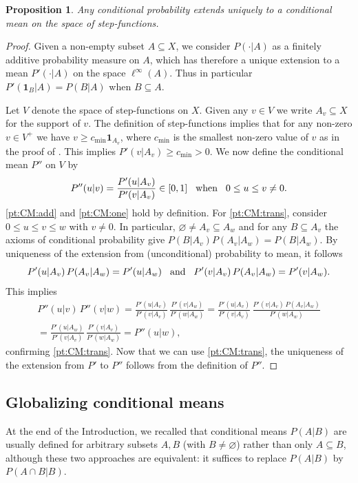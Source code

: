 \documentclass[11pt]{amsart}
\numberwithin{equation}{section}
\newtheorem{prop}[thm]{Proposition}
\theoremstyle{definition}
\theoremstyle{definition}
\newcommand*{\se}{\subseteq}
\newcommand*{\one}{\boldsymbol{1}}
\begin{document}
\begin{prop}\label{prop:CP-CM-step}
Any conditional probability extends uniquely to a conditional mean on the space of step-functions.
\end{prop}

\begin{proof}
Given a non-empty subset $A\se X$, we consider $P(\cdot|A)$ as a finitely additive probability measure on $A$, which has therefore a unique extension to a mean $P'(\cdot| A)$ on the space $\ell^\infty(A)$. Thus in particular $P'(\one_B|A) = P(B|A)$ when $B\se A$.

Let $V$ denote the space of step-functions on $X$. Given any $v\in V$ we write $A_v\se X$ for the support of $v$. The definition of step-functions implies that for any non-zero $v\in V^+$ we have $v\geq c_\mathrm{min} \one_{A_v}$, where $c_\mathrm{min}$ is the smallest non-zero value of $v$ as in the proof of . This implies $P'(v | A_v) \geq c_\mathrm{min} >0$. We now define the conditional mean $P''$ on $V$ by
\begin{equation*}
P''(u|v) = \frac{P'(u|A_v)}{P'(v|A_v)} \in[0, 1]\kern3mm \text{when}\kern3mm 0\leq u \leq v \neq 0.
\end{equation*}
\ref{pt:CM:add} and \ref{pt:CM:one} hold by definition. For \ref{pt:CM:trans}, consider $0\leq u \leq v \leq w$ with $v\neq 0$. In particular, $\varnothing\neq A_v \se A_w$ and for any $B\se A_v$ the axioms of conditional probability give $P(B|A_v) P(A_v|A_w) = P(B|A_w)$. By uniqueness of the extension from (unconditional) probability to mean, it follows
\begin{equation*}
P'(u|A_v) \, P(A_v|A_w) = P'(u|A_w)\kern3mm \text{and}\kern3mm P'(v|A_v) \, P(A_v|A_w) = P'(v|A_w).
\end{equation*}
This implies
\begin{multline*}
P''(u|v) \, P''(v|w) =\frac{P'(u|A_v)}{P'(v|A_v)} \, \frac{P'(v|A_w)}{P'(w|A_w)} =\frac{P'(u|A_v)}{P'(v|A_v)} \, \frac{ P'(v|A_v) \, P(A_v|A_w)} {P'(w|A_w)} \\
 = \frac{P'(u|A_w)}{P'(v|A_v)} \, \frac{ P'(v|A_v)} {P'(w|A_w)} = P''(u|w),
\end{multline*}
confirming \ref{pt:CM:trans}. Now that we can use \ref{pt:CM:trans}, the uniqueness of the extension from $P'$ to $P''$ follows from the definition of $P''$.
\end{proof}

\subsection{Globalizing conditional means}\label{sec:hyper-Arch}%
At the end of the Introduction, we recalled that conditional means $P(A|B)$ are usually defined for arbitrary subsets $A, B$ (with $B\neq \varnothing$) rather than only $A\se B$, although these two approaches are equivalent: it suffices to replace $P(A|B)$ by $P(A \cap B|B)$.
\end{document}
